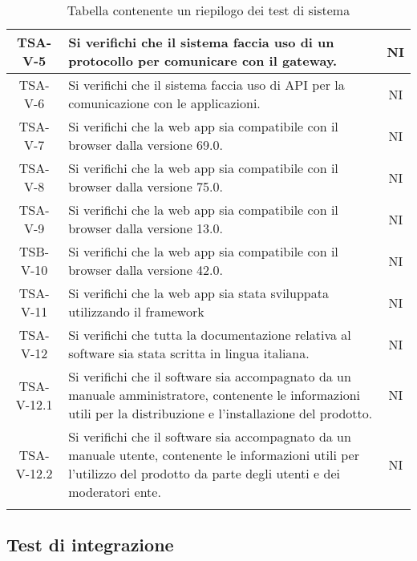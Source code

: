 \begin{center}
\begin{longtable}{|c|p{10cm}|c|}
			 \hline
			 TSA-V-5 & Si verifichi che il sistema faccia uso di un protocollo per comunicare con il gateway. & NI \\
			 \hline
			 TSA-V-6 & Si verifichi che il sistema faccia uso di API per la comunicazione con le applicazioni. & NI \\
			 \hline
			 TSA-V-7 & Si verifichi che la web app sia compatibile con il browser \glock{Firefox} dalla versione 69.0. & NI \\
			 \hline
			 TSA-V-8 & Si verifichi che la web app sia compatibile con il browser \glock{Chrome} dalla versione 75.0. & NI \\
			 \hline
			 TSA-V-9 & Si verifichi che la web app sia compatibile con il browser \glock{Safari} dalla versione 13.0. & NI \\
			 \hline
			 TSB-V-10 & Si verifichi che la web app sia compatibile con il browser \glock{Edge} dalla versione 42.0. & NI \\
			 \hline
			 TSA-V-11 & Si verifichi che la web app sia stata sviluppata utilizzando il framework \glock{Bootstrap} & NI \\
			 \hline
			 TSA-V-12 & Si verifichi che tutta la documentazione relativa al software sia stata scritta in lingua italiana. & NI \\
			 \hline
			 TSA-V-12.1 & Si verifichi che il software sia accompagnato da un manuale amministratore, contenente le informazioni utili per la distribuzione e l'installazione del prodotto. & NI \\
			 \hline
			 TSA-V-12.2 & Si verifichi che il software sia accompagnato da un manuale utente, contenente le informazioni utili per l'utilizzo del prodotto da parte degli utenti e dei moderatori ente. & NI \\
			 \hline

			 \caption{Tabella contenente un riepilogo dei test di sistema}
			\end{longtable}
		\end{center}


	\subsection{Test di integrazione}

